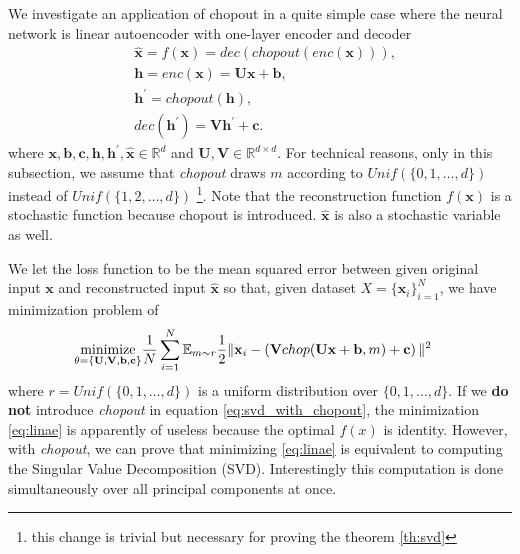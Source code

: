 \documentclass{article}
\newcommand{\minimize}{\mathop{\rm minimize}\limits}
\begin{document}
    We investigate an application of chopout in a quite simple case where the neural network is linear autoencoder with one-layer encoder and decoder
    \begin{align}
      &\hat{\mathbf{x}} = f(\mathbf{x}) =  dec(chopout(enc(\mathbf{x}))), \nonumber \\
      &\mathbf{h} = enc(\mathbf{x}) = \mathbf{U} \mathbf{x} + \mathbf{b}, \nonumber \\      
      &\mathbf{h}^\prime = chopout(\mathbf{h}), \label{eq:svd_with_chopout}\\
      &dec(\mathbf{h}^\prime) = \mathbf{V} \mathbf{h}^\prime + \mathbf{c}. \nonumber 
    \end{align}
    where $\mathbf{x}, \mathbf{b}, \mathbf{c}, \mathbf{h}, \mathbf{h}^\prime, \hat{\mathbf{x}} \in \mathbb{R}^d$ and  $\mathbf{U}, \mathbf{V} \in \mathbb{R}^{d \times d}$. 
    For technical reasons, only in this subsection, we assume that \textit{chopout} draws $m$ according to $Unif(\{0, 1, \dots, d\})$ instead of $Unif(\{1, 2, \dots, d\})$ 
    \footnote{this change is trivial but necessary for proving the theorem \ref{th:svd}}.
    Note that the reconstruction function $f(\mathbf{x})$ is a stochastic function because chopout is introduced. $\hat{\mathbf{x}}$ is also a stochastic variable as well.

    We let the loss function to be the mean squared error between given original input $\mathbf{x}$ and reconstructed input $\hat{\mathbf{x}}$ so that, given dataset $X = \{\mathbf{x}_i\}_{i=1}^N$, we have minimization problem of
    \begin{align}
      \minimize_{\mathbf{\theta} = \left\{ \mathbf{U}, \mathbf{V}, \mathbf{b}, \mathbf{c}\right\}} &\frac{1}{N} \sum_{i=1}^N \mathbb{E}_{m \sim r} \frac{1}{2} \Vert \mathbf{x}_i - \left( \mathbf{V} chop(\mathbf{U} \mathbf{x} + \mathbf{b}, m) + \mathbf{c} \right) \Vert^2 \label{eq:linae}
    \end{align}
    where $r = Unif(\{0,1,\dots,d\})$ is a uniform distribution over $\{0, 1, \dots, d\}$.
    If we \textbf{do not} introduce \textit{chopout} in equation \ref{eq:svd_with_chopout}, the minimization \ref{eq:linae} is apparently of useless because the optimal $f(x)$ is identity. However, with \textit{chopout}, we can prove that minimizing \ref{eq:linae} is equivalent to computing the Singular Value Decomposition (SVD). Interestingly this computation is done simultaneously over all principal components at once.
\end{document}

